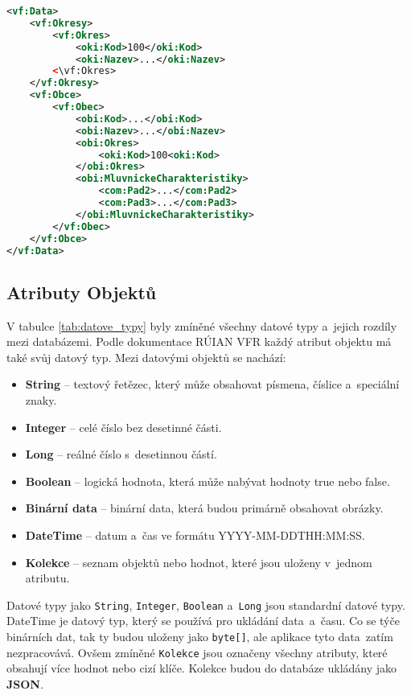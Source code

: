 \begin{lstlisting}[language=xml, caption={Příklad Klasifikátorů}, label=lst:klasifikator]
<vf:Data>
    <vf:Okresy>
        <vf:Okres>
            <oki:Kod>100</oki:Kod>
            <oki:Nazev>...</oki:Nazev>
        <\vf:Okres>
    </vf:Okresy>
    <vf:Obce>
        <vf:Obec>
            <obi:Kod>...</obi:Kod>
            <obi:Nazev>...</obi:Nazev>
            <obi:Okres>
                <oki:Kod>100<oki:Kod>
            </obi:Okres>
            <obi:MluvnickeCharakteristiky>
                <com:Pad2>...</com:Pad2>
                <com:Pad3>...</com:Pad3>
            </obi:MluvnickeCharakteristiky>
        </vf:Obec>
    </vf:Obce>
</vf:Data>
\end{lstlisting}

\subsection{Atributy Objektů}
V tabulce \ref{tab:datove_typy} byly zmíněné všechny datové typy a~jejich rozdíly mezi databázemi.
Podle dokumentace RÚIAN VFR \cite{ruian_vfr} každý atribut objektu má také svůj datový typ.
Mezi datovými objektů se nachází:
\begin{itemize}
    \item \textbf{String} -- textový řetězec, který může obsahovat písmena, číslice a~speciální znaky.
    \item \textbf{Integer} -- celé číslo bez desetinné části.
    \item \textbf{Long} -- reálné číslo s~desetinnou částí.
    \item \textbf{Boolean} -- logická hodnota, která může nabývat hodnoty true nebo false.
    \item \textbf{Binární data} -- binární data, která budou primárně obsahovat obrázky.
    \item \textbf{DateTime} -- datum a~čas ve formátu YYYY-MM-DDTHH:MM:SS.
    \item \textbf{Kolekce} -- seznam objektů nebo hodnot, které jsou uloženy v~jednom atributu.
\end{itemize}

Datové typy jako \texttt{String}, \texttt{Integer}, \texttt{Boolean} a~\texttt{Long} jsou standardní datové typy.
DateTime je datový typ, který se používá pro ukládání data~a~času. Co se týče binárních dat, tak ty budou uloženy jako \texttt{byte[]}, 
ale aplikace tyto data~zatím nezpracovává.
Ovšem zmíněné \texttt{Kolekce} jsou označeny všechny atributy, které obsahují více hodnot nebo cizí klíče.
Kolekce budou do databáze ukládány jako \textbf{JSON}.

